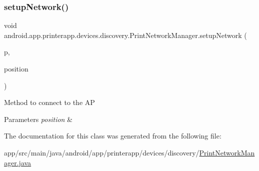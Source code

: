 \subsubsection{\texorpdfstring{setup\+Network()}{setupNetwork()}}
{\footnotesize\ttfamily void android.\+app.\+printerapp.\+devices.\+discovery.\+Print\+Network\+Manager.\+setup\+Network (\begin{DoxyParamCaption}\item[{\hyperlink{classandroid_1_1app_1_1printerapp_1_1model_1_1_model_printer}{Model\+Printer}}]{p,  }\item[{int}]{position }\end{DoxyParamCaption})}

Method to connect to the AP


\begin{DoxyParams}{Parameters}
{\em position} & \\
\hline
\end{DoxyParams}


The documentation for this class was generated from the following file\+:\begin{DoxyCompactItemize}
\item 
app/src/main/java/android/app/printerapp/devices/discovery/\hyperlink{_print_network_manager_8java}{Print\+Network\+Manager.\+java}\end{DoxyCompactItemize}
